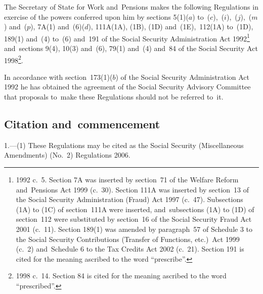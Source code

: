 \documentclass[12pt,a4paper]{article}
\title{\regstitle}
\author{S.I.\ 2006 No.\ 832}
\date{Made
20th March 2006\\
Laid before Parliament
20th March 2006\\
Coming into~force\\
except for regulation~3
10th April 2006\\
regulation~3
24th July 2006
}
\begin{document}
\maketitle

\enlargethispage{1.65405pt}

\begin{sloppypar}
\noindent
The Secretary of State for Work and~Pensions makes the following Regulations in exercise of the powers conferred upon him by sections 5(1)($a$)  to~($c$),~($i$),~($j$),~($m$)  and~($p$), 7A(1) and~(6)($d$), 111A(1A), (1B), (1D) and~(1E),~112(1A) to~(1D), 189(1) and~(4) to~(6) and~191 of the Social Security Administration Act 1992\footnote{1992 c.~5. Section 7A was inserted by section~71 of the Welfare Reform and~Pensions Act 1999 (c.~30). Section 111A was inserted by section~13 of the Social Security Administration (Fraud) Act 1997 (c.~47). Subsections (1A) to (1C) of section~111A were inserted, and~subsections (1A) to (1D) of section~112 were substituted by section~16 of the Social Security Fraud Act 2001 (c.~11). Section 189(1) was amended by paragraph~57 of Schedule 3 to the Social Security Contributions (Transfer of Functions, etc.)\ Act 1999 (c.~2) and~Schedule 6 to the Tax Credits Act 2002 (c.~21). Section 191 is cited for the meaning ascribed to the word “prescribe”.} and~sections 9(4), 10(3) and~(6), 79(1) and~(4) and~84 of the Social Security Act 1998\footnote{1998 c.~14. Section 84 is cited for the meaning ascribed to the word “prescribed”.}.
\end{sloppypar}

In accordance with section~173(1)($b$)  of the Social Security Administration Act 1992 he has obtained the agreement of the Social Security Advisory Committee that proposals to~make these Regulations should not be referred to~it. 

{\sloppy

\tableofcontents

}

\bigskip

\setcounter{secnumdepth}{-2}

\subsection[1. Citation and~commencement]{Citation and~commencement}

1.---(1)  These Regulations may be cited as the Social Security (Miscellaneous Amendments) (No.~2) Regulations 2006.
\end{document}
